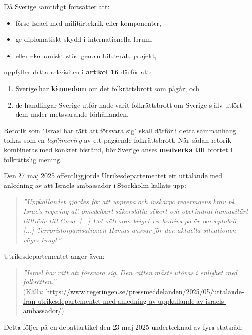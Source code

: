 Då Sverige samtidigt fortsätter att:

\begin{itemize}
\item förse Israel med militärteknik eller komponenter,
\item ge diplomatiskt skydd i internationella forum,
\item eller ekonomiskt stöd genom bilaterala projekt,
\end{itemize}

uppfyller detta rekvisiten i \textbf{artikel 16} därför att:

\begin{enumerate}
\item Sverige har \textbf{kännedom} om det folkrättsbrott som pågår; och
\item de handlingar Sverige utför hade varit folkrättsbrott om Sverige själv utfört dem under motsvarande förhållanden.
\end{enumerate}

Retorik som "Israel har rätt att försvara sig" skall därför i detta sammanhang tolkas som en \emph{legitimering} av ett pågående folkrättsbrott. När sådan retorik kombineras med konkret bistånd, bör Sverige anses \textbf{medverka till} brottet i folkrättslig mening.






Den 27 maj 2025 offentliggjorde Utrikesdepartementet ett uttalande med anledning av att Israels ambassadör i Stockholm kallats upp:

\begin{quote}
\textit{”Uppkallandet gjordes för att upprepa och inskärpa regeringens krav på Israels regering att omedelbart säkerställa säkert och obehindrat humanitärt tillträde till Gaza. [...] Det sätt som kriget nu bedrivs på är oacceptabelt. [...] Terroristorganisationen Hamas ansvar för den aktuella situationen väger tungt.”}
\end{quote}

Utrikesdepartementet anger även:
\begin{quote}
\textit{”Israel har rätt att försvara sig. Den rätten måste utövas i enlighet med folkrätten.”}\\
(Källa: \url{https://www.regeringen.se/pressmeddelanden/2025/05/uttalande-fran-utrikesdepartementet-med-anledning-av-uppkallande-av-israels-ambassador/})
\end{quote}

Detta följer på en debattartikel den 23 maj 2025 undertecknad av fyra statsråd:


